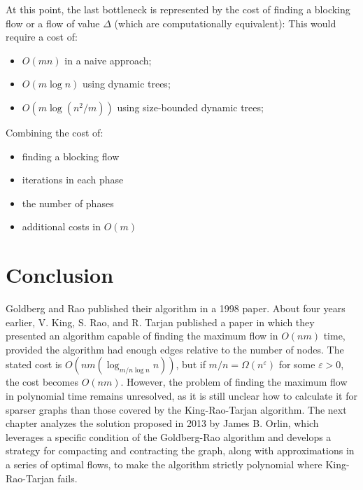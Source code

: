     At this point, the last bottleneck is represented by the cost of finding a blocking flow or a flow of value \( \Delta \) (which are computationally equivalent):  
    This would require a cost of:
    \begin{itemize}
        \item \( O(mn) \) in a naive approach;
        \item \( O(m \log n) \) using dynamic trees\cite{dynamicTrees};
        \item \( O(m \log(n^2/m)) \) using size-bounded dynamic trees;
    \end{itemize}
    
    Combining the cost of:
    \begin{itemize}[label=$\times$]
        \item finding a blocking flow
        \item iterations in each phase
        \item the number of phases
        \item additional costs in \( O(m) \)
    \end{itemize}
    
    \section*{Conclusion}
    Goldberg and Rao published their algorithm in a 1998 paper. About four years earlier, V. King, S. Rao, and R. Tarjan published a paper in which they presented an algorithm capable of finding the maximum flow in \( O(nm) \) time, provided the algorithm had enough edges relative to the number of nodes.  
    The stated cost is \( O(nm(\log_{m/n \log n} n)) \), but if \( m/n = \Omega(n^\varepsilon) \) for some \( \varepsilon > 0 \), the cost becomes \( O(nm) \).  
    However, the problem of finding the maximum flow in polynomial time remains unresolved, as it is still unclear how to calculate it for sparser graphs than those covered by the King-Rao-Tarjan\cite{kingRaoTarjan} algorithm.  
    The next chapter analyzes the solution proposed in 2013 by James B. Orlin\cite{Orlin}, which leverages a specific condition of the Goldberg-Rao algorithm and develops a strategy for compacting and contracting the graph, along with approximations in a series of optimal flows, to make the algorithm strictly polynomial where King-Rao-Tarjan fails.
\cleardoublepage
